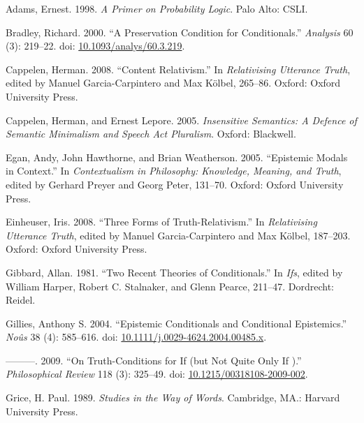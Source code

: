 \documentclass[
  10pt,
  letterpaper,
  DIV=11,
  numbers=noendperiod,
  twoside]{scrartcl}
\newlength{\cslhangindent}
\newenvironment{CSLReferences}[2] %
 {\begin{list}{}{%
  \setlength{\itemindent}{0pt}
  \setlength{\leftmargin}{0pt}
  \setlength{\parsep}{0pt}
  \ifodd #1
   \setlength{\leftmargin}{\cslhangindent}
   \setlength{\itemindent}{-1\cslhangindent}
  \fi
  \setlength{\itemsep}{#2\baselineskip}}}
 {\end{list}}
\begin{document}
\label{refs}
\begin{CSLReferences}{1}{0}
Adams, Ernest. 1998. \emph{A Primer on Probability Logic}. Palo Alto:
CSLI.

Bradley, Richard. 2000. {``A Preservation Condition for Conditionals.''}
\emph{Analysis} 60 (3): 219--22. doi:
\href{https://doi.org/10.1093/analys/60.3.219}{10.1093/analys/60.3.219}.

Cappelen, Herman. 2008. {``Content Relativism.''} In \emph{Relativising
Utterance Truth}, edited by Manuel Garcia-Carpintero and Max Kölbel,
265--86. Oxford: Oxford University Press.

Cappelen, Herman, and Ernest Lepore. 2005. \emph{Insensitive Semantics:
A Defence of Semantic Minimalism and Speech Act Pluralism}. Oxford:
Blackwell.

Egan, Andy, John Hawthorne, and Brian Weatherson. 2005. {``{Epistemic
Modals in Context}.''} In \emph{Contextualism in Philosophy: Knowledge,
Meaning, and Truth}, edited by Gerhard Preyer and Georg Peter, 131--70.
Oxford: Oxford University Press.

Einheuser, Iris. 2008. {``Three Forms of Truth-Relativism.''} In
\emph{Relativising Utterance Truth}, edited by Manuel Garcia-Carpintero
and Max Kölbel, 187--203. Oxford: Oxford University Press.

Gibbard, Allan. 1981. {``Two Recent Theories of Conditionals.''} In
\emph{Ifs}, edited by William Harper, Robert C. Stalnaker, and Glenn
Pearce, 211--47. Dordrecht: Reidel.

Gillies, Anthony S. 2004. {``Epistemic Conditionals and Conditional
Epistemics.''} \emph{No{û}s} 38 (4): 585--616. doi:
\href{https://doi.org/10.1111/j.0029-4624.2004.00485.x}{10.1111/j.0029-4624.2004.00485.x}.

---------. 2009. {``{On Truth-Conditions for If (but Not Quite Only If
)}.''} \emph{Philosophical Review} 118 (3): 325--49. doi:
\href{https://doi.org/10.1215/00318108-2009-002}{10.1215/00318108-2009-002}.

Grice, H. Paul. 1989. \emph{Studies in the Way of Words}. Cambridge,
MA.: Harvard University Press.


\end{CSLReferences}
\end{document}
